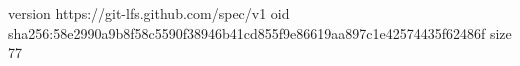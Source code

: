 version https://git-lfs.github.com/spec/v1
oid sha256:58e2990a9b8f58c5590f38946b41cd855f9e86619aa897c1e42574435f62486f
size 77
